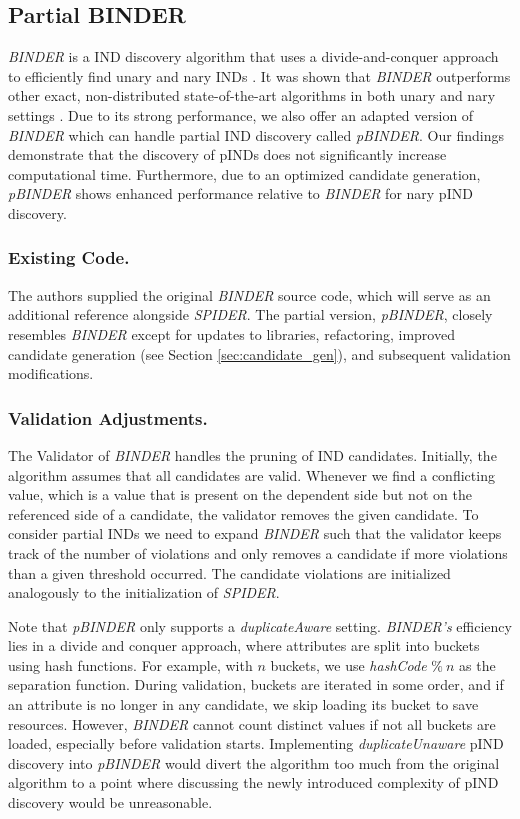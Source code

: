 \subsection{Partial BINDER}
\textit{BINDER} is a IND discovery algorithm that uses a divide-and-conquer approach to efficiently find unary and nary INDs \cite{papenbrock2015divide}. It was shown that \textit{BINDER} outperforms other exact, non-distributed state-of-the-art algorithms in both unary and nary settings \cite{dursch2019inclusion}. Due to its strong performance, we also offer an adapted version of \textit{BINDER} which can handle partial IND discovery called \textit{pBINDER}. Our findings demonstrate that the discovery of pINDs does not significantly increase computational time. Furthermore, due to an optimized candidate generation, \textit{pBINDER} shows enhanced performance relative to \textit{BINDER} for nary pIND discovery.

\subsubsection{\textbf{Existing Code.}}
The authors supplied the original \textit{BINDER} source code, which will serve as an additional reference alongside \textit{SPIDER}. The partial version, \textit{pBINDER}, closely resembles \textit{BINDER} except for updates to libraries, refactoring, improved candidate generation (see Section \ref{sec:candidate_gen}), and subsequent validation modifications. 

\subsubsection{\textbf{Validation Adjustments.}}
The Validator of \textit{BINDER} handles the pruning of IND candidates. Initially, the algorithm assumes that all candidates are valid. Whenever we find a conflicting value, which is a value that is present on the dependent side but not on the referenced side of a candidate, the validator removes the given candidate. To consider partial INDs we need to expand \textit{BINDER} such that the validator keeps track of the number of violations and only removes a candidate if more violations than a given threshold occurred. The candidate violations are initialized analogously to the initialization of \textit{SPIDER}.

Note that \textit{pBINDER} only supports a \textit{duplicateAware} setting. \linebreak \textit{BINDER's} efficiency lies in a divide and conquer approach, where attributes are split into buckets using hash functions. For example, with $n$ buckets, we use \textit{hashCode} $\% \: n$ as the separation function. During validation, buckets are iterated in some order, and if an attribute is no longer in any candidate, we skip loading its bucket to save resources. However, \textit{BINDER} cannot count distinct values if not all buckets are loaded, especially before validation starts. Implementing \textit{duplicateUnaware} pIND discovery into \textit{pBINDER} would divert the algorithm too much from the original algorithm to a point where discussing the newly introduced complexity of pIND discovery would be unreasonable.